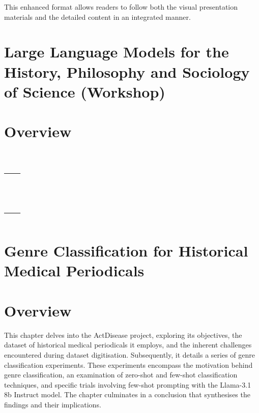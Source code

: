 \documentclass[
  letterpaper,
]{book}
\begin{document}
This enhanced format allows readers to follow both the visual
presentation materials and the detailed content in an integrated manner.


\chapter{Large Language Models for the History, Philosophy and Sociology
of Science
(Workshop)}\label{large-language-models-for-the-history-philosophy-and-sociology-of-science-workshop}


\chapter*{Overview}\label{overview}



\chapter{---}\label{section}


\chapter{---}\label{section-1}


\chapter{Genre Classification for Historical Medical
Periodicals}\label{genre-classification-for-historical-medical-periodicals}


\chapter*{Overview}\label{overview-1}


This chapter delves into the ActDisease project, exploring its
objectives, the dataset of historical medical periodicals it employs,
and the inherent challenges encountered during dataset digitisation.
Subsequently, it details a series of genre classification experiments.
These experiments encompass the motivation behind genre classification,
an examination of zero-shot and few-shot classification techniques, and
specific trials involving few-shot prompting with the Llama-3.1 8b
Instruct model. The chapter culminates in a conclusion that synthesises
the findings and their implications.
\end{document}
